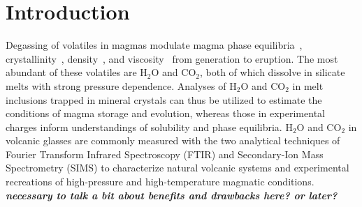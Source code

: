 \documentclass[draft]{agujournal2019}
\begin{document}


\begin{abstract}

\end{abstract}









\section{Introduction} 

Degassing of volatiles in magmas modulate magma phase equilibria~\cite{SissonandGrove1993}, crystallinity~\cite{BlundyandCashman2001}, density~\cite{OchsandLange1999}, and viscosity~\cite{HessandDingwell1996} from generation to eruption. The most abundant of these volatiles are H$_2$O and CO$_2$, both of which dissolve in silicate melts with strong pressure dependence. Analyses of H$_2$O and CO$_2$ in melt inclusions trapped in mineral crystals can thus be utilized to estimate the conditions of magma storage and evolution, whereas those in experimental charges inform understandings of solubility and phase equilibria. H$_2$O and CO$_2$ in volcanic glasses are commonly measured with the two analytical techniques of Fourier Transform Infrared Spectroscopy (FTIR) and Secondary-Ion Mass Spectrometry (SIMS) to characterize natural volcanic systems and experimental recreations of high-pressure and high-temperature magmatic conditions. \textbf{\textit{necessary to talk a bit about benefits and drawbacks here? or later?}}
\end{document}
